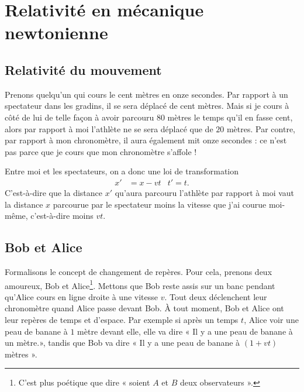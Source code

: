 
\section{Relativité en mécanique newtonienne}

\subsection{Relativité du mouvement}

Prenons quelqu'un qui cours le cent mètres en onze secondes. Par rapport à un spectateur dans les gradins, il se sera déplacé de cent mètres. Mais si je cours à côté de lui de telle façon à avoir parcouru $80$ mètres le temps qu'il en fasse cent, alors par rapport à moi l'athlète ne se sera déplacé que de $20$ mètres. Par contre, par rapport à mon chronomètre, il aura également mit onze secondes : ce n'est pas parce que je cours que mon chronomètre s'affole !

Entre moi et les spectateurs, on a donc une loi de transformation
\begin{align}		\label{EqTransGal}
x'&=x-vt&	t'=t.
\end{align}
C'est-à-dire que la distance $x'$ qu'aura parcouru l'athlète par rapport à moi vaut la distance $x$ parcourue par le spectateur moins la vitesse que j'ai courue moi-même, c'est-à-dire moins $vt$.

\subsection{Bob et Alice}

Formalisons le concept de changement de repères. Pour cela, prenons deux amoureux, Bob et Alice\footnote{C'est plus poétique que dire « soient $A$ et $B$ deux observateurs ».}. Mettons que Bob reste assis sur un banc pendant qu'Alice cours en ligne droite à une vitesse $v$. Tout deux déclenchent leur chronomètre quand Alice passe devant Bob. À tout moment, Bob et Alice ont leur repères de temps et d'espace. Par exemple si après un temps $t$, Alice voir une peau de banane à $1$ mètre devant elle, elle va dire « Il y a une peau de banane à un mètre.», tandis que Bob va dire « Il y a une peau de banane à $(1+vt)$ mètres ».

